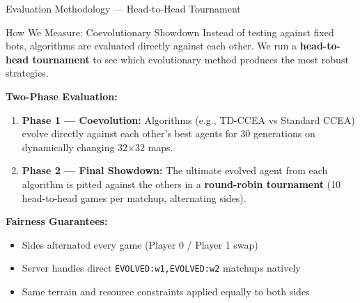 \documentclass[aspectratio=169, 10pt]{beamer}
\begin{document}
\begin{frame}{Evaluation Methodology --- Head-to-Head Tournament}
\small
\begin{block}{How We Measure: Coevolutionary Showdown}
Instead of testing against fixed bots, algorithms are evaluated directly against each other. We run a \textbf{head-to-head tournament} to see which evolutionary method produces the most robust strategies.
\end{block}
\vspace{0.15cm}
\textbf{Two-Phase Evaluation:}
\begin{enumerate}
    \item \textbf{Phase 1 --- Coevolution:} Algorithms (e.g., TD-CCEA vs Standard CCEA) evolve directly against each other's best agents for 30 generations on dynamically changing 32$\times$32 maps.
    \item \textbf{Phase 2 --- Final Showdown:} The ultimate evolved agent from each algorithm is pitted against the others in a \textbf{round-robin tournament} (10 head-to-head games per matchup, alternating sides).
\end{enumerate}
\vspace{0.15cm}
\textbf{Fairness Guarantees:}
\begin{itemize}
    \item Sides alternated every game (Player 0 / Player 1 swap)
    \item Server handles direct \texttt{EVOLVED:w1,EVOLVED:w2} matchups natively
    \item Same terrain and resource constraints applied equally to both sides
\end{itemize}
\end{frame}
\end{document}
